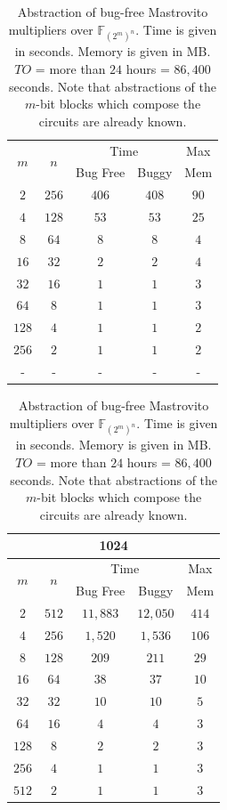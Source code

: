 \begin{table}[!h]
{\begin{tabular}{|c|c|c|c|c|}
\multirow{2}{*}{$m$} &  \multirow{2}{*}{$n$} & \multicolumn{2}{c|}{Time} & Max \\
\hhline{~~--~}
     &        & Bug Free & Buggy & Mem  \\
\hline
  $2$ & $256$ &    $406$ & $408$ & $90$ \\
\hline
  $4$ & $128$ &     $53$ &  $53$ & $25$ \\
\hline
  $8$ &  $64$ &      $8$ &   $8$ &  $4$ \\
\hline
 $16$ &  $32$ &      $2$ &   $2$ &  $4$ \\
\hline
 $32$ &  $16$ &      $1$ &   $1$ &  $3$ \\
\hline
 $64$ &   $8$ &      $1$ &   $1$ &  $3$ \\
\hline
$128$ &   $4$ &      $1$ &   $1$ &  $2$ \\
\hline
$256$ &   $2$ &      $1$ &   $1$ &  $2$ \\
\hline
  -   &   -   &      -   &   -   &   -  \\
\hline
\end{tabular}
\begin{tabular}{|c|c|c|c|c|}
\hline
\multicolumn{5}{|c|}{1024}\\
\hline
\multirow{2}{*}{$m$} &  \multirow{2}{*}{$n$} & \multicolumn{2}{c|}{Time} & Max \\
\hhline{~~--~}
      &       & Bug Free &  Buggy   &   Mem \\
\hline
  $2$ & $512$ & $11,883$ & $12,050$ & $414$ \\
\hline
  $4$ & $256$ &  $1,520$ &  $1,536$ & $106$ \\
\hline
  $8$ & $128$ &    $209$ &    $211$ &  $29$ \\
\hline
 $16$ &  $64$ &     $38$ &     $37$ &  $10$ \\
\hline
 $32$ &  $32$ &     $10$ &     $10$ &   $5$ \\
\hline
 $64$ &  $16$ &      $4$ &      $4$ &   $3$ \\
\hline
$128$ &   $8$ &      $2$ &      $2$ &   $3$ \\
\hline
$256$ &   $4$ &      $1$ &      $1$ &   $3$ \\
\hline
$512$ &   $2$ &      $1$ &      $1$ &   $3$ \\
\hline
\end{tabular}
}
\caption{Abstraction of bug-free Mastrovito multipliers over $\mathbb{F}_{(2^m)^n}$. Time is given in seconds. Memory is given in MB. $TO$ = more than $24$ hours = $86,400$ seconds. 
Note that abstractions of the $m$-bit blocks which compose the circuits are already known.}
\label{tbl:compositeToolResults}
\end{table}


